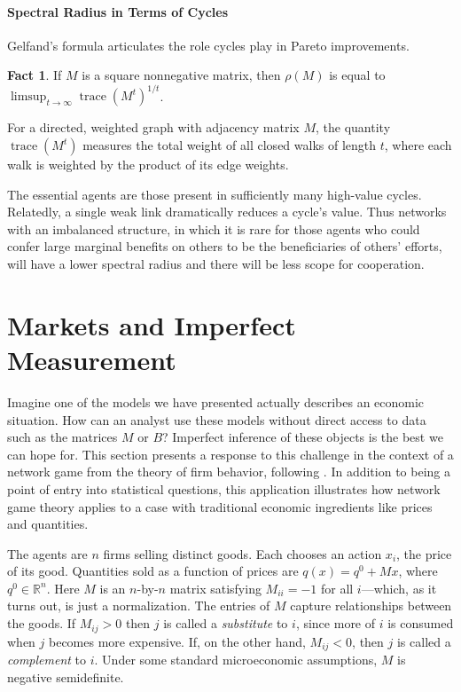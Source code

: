 \documentclass{notices}
\theoremstyle{definition}\newtheorem{problem}{Problem}
\theoremstyle{definition} \newtheorem{remark}{Remark}
\theoremstyle{definition} \newtheorem{claim}{Claim}
\DeclareMathOperator{\trace}{trace}
\theoremstyle{definition} \newtheorem{thm}{Theorem}
\theoremstyle{definition} \newtheorem*{thmNoNum}{Theorem}
\theoremstyle{definition} \newtheorem{definition}{Definition}
\theoremstyle{definition} \theoremstyle{remark}
\theoremstyle{definition} \newtheorem{note}{Note}
\theoremstyle{definition} \newtheorem{notation}{Notation}
\theoremstyle{definition} \theoremstyle{plain}
\theoremstyle{definition} \newtheorem{condition}{Condition}
\theoremstyle{definition} \newtheorem{lem}{Lemma}
\theoremstyle{definition} \newtheorem{corollary}{Corollary}
\theoremstyle{definition} \newtheorem{prop}{Proposition}
\theoremstyle{definition} \newtheorem{ax}{Axiom}
\theoremstyle{definition} \newtheorem{assumption}{Assumption}
\theoremstyle{definition} \newtheorem{example}{Example}
\theoremstyle{definition} \newtheorem{rmk}{Remark}
\theoremstyle{definition} \newtheorem{res}{Result}
\theoremstyle{definition} \newtheorem{que}{Question}
\theoremstyle{definition} \newtheorem{conjecture}{Conjecture}
\newtheorem{fact}{Fact}
\theoremstyle{definition}
\begin{document}
\paragraph{Spectral Radius in Terms of Cycles}


Gelfand's formula articulates the role cycles play in Pareto improvements.


\begin{fact}\label{fact:cycles}\label{fact:monotonic}
If ${M}$ is a square nonnegative matrix, then $\rho({M})$ is equal to $\limsup_{t \to \infty} \trace \left({M}^t\right)^{1/t}$.


\end{fact}


For a directed, weighted graph with adjacency matrix ${M}$, the quantity $\trace \left({M}^t\right)$ measures the total weight of all closed walks of length $t$, where each walk is weighted by the product of its edge weights.

The essential agents are those present in sufficiently many high-value cycles. Relatedly, a single weak link dramatically reduces a cycle's value. Thus networks with an imbalanced structure, in which it is rare for those agents who could confer large marginal benefits on others to be the beneficiaries of others' efforts, will have a lower spectral radius and there will be less scope for cooperation.



\section*{Markets and Imperfect Measurement}

Imagine one of the models we have presented actually describes an economic situation. How can an analyst use these models without direct access to data such as the matrices $M$ or $B$? Imperfect inference of these objects is the best we can hope for. This section presents a response to this challenge in the context of a network game from the theory of firm behavior, following \cite{GaleottiGolubGoyalTalamasTamuz2026}. In addition to being a point of entry into statistical questions, this application illustrates how network game theory applies to a case with traditional economic ingredients like prices and quantities. 

The agents are \( n \) firms selling distinct goods.  Each chooses an action $x_i$, the price of its good. Quantities sold as a function of prices are $q(x)=q^0+Mx$, where $q^0 \in \mathbb{R}^n$. Here $M$ is an $n$-by-$n$ matrix satisfying $M_{ii}=-1$ for all $i$---which, as it turns out, is just a normalization. The entries of $M$ capture relationships between the goods. If $M_{ij}>0$ then $j$ is called a \emph{substitute} to $i$, since more of $i$ is consumed when $j$ becomes more expensive. If, on the other hand, $M_{ij}<0$, then $j$ is called a \emph{complement} to $i$. Under some standard microeconomic assumptions, $M$ is negative semidefinite. 
\end{document}
